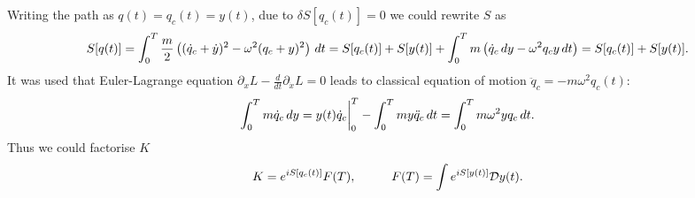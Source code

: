 Writing the path as $q(t) = q_c(t) = y(t)$, due to $\delta S[q_c(t)] = 0$ we could rewrite $S$ as 
\begin{equation*}
	S[q(t)] = \int_{0}^{T} \frac{m}{2}\left(
		(\dot{q}_c + \dot{y})^2 - \omega^2 (q_c + y)^2
	\right) \, d t = S[q_c(t)] + S[y(t)] + \int_{0}^{T} m\left(
		\dot{q}_c \, d y - \omega^2 q_c y \, d t
	\right)  = S[q_c(t)] + S[y(t)].
\end{equation*}
It was used that Euler-Lagrange equation $\partial_x L - \frac{d }{d t} \partial_{\dot{x}} L = 0$ leads to classical equation of motion $\ddot{q}_c = - m \omega^2 q_c(t)$:
\begin{equation*}
	\int_{0}^{T}  m \dot{q}_c \, d y = y(t) \dot{q}_c \bigg|_0^T - \int_{0}^{T} m y \ddot{q}_c \, d t = \int_{0}^{T}  m \omega^2 y q_c \, d t. 
\end{equation*}
Thus we could factorise $K$
\begin{equation*}
	K = e^{i S[q_c(t)]} F(T),
	\hspace{10 mm} 
	F(T) = \int e^{i S[y(t)]} \F y(t).
\end{equation*}
